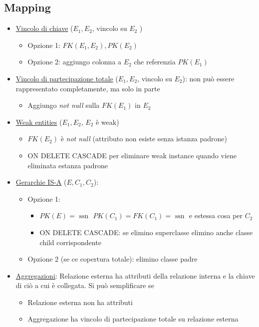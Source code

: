 \subsection{Mapping}
\begin{itemize}
	\item \underline{Vincolo di chiave} ($ E_1, E_2 $, vincolo su $ E_2 $ )
	      \begin{itemize}
		      \item Opzione 1: $ FK\left(E_1, E_2\right), PK\left(E_2\right) $
		      \item Opzione 2: aggiungo colonna a $ E_2 $ che referenzia $ PK\left(E_1\right) $
	      \end{itemize}
	\item \underline{Vincolo di partecipazione totale} ($ E_1, E_2 $, vincolo su $ E_2 $): non può essere rappresentato completamente, ma solo in parte
	      \begin{itemize}
		      \item Aggiungo \textit{not null} sulla $ FK\left(E_1\right) $ in $ E_2 $
	      \end{itemize}
	\item \underline{Weak entities} ($ E_1, E_2 $, $ E_2 $ è weak)
	      \begin{itemize}
		      \item $ FK\left(E_2\right) $ è \textit{not null} (attributo non esiste senza istanza padrone)
		      \item ON DELETE CASCADE per eliminare weak instance quando viene eliminata estanza padrone
	      \end{itemize}
	\item \underline{Gerarchie IS-A} ($ E, C_1, C_2 $):
	      \begin{itemize}
		      \item Opzione 1:
		            \begin{itemize}
			            \item $ PK(E) = \text{ ssn }$  $ PK\left(C_1\right) = FK\left(C_1\right) = \text{ ssn } $ e estessa cosa per $ C_2 $
			            \item ON DELETE CASCADE: se elimino superclasse elimino anche classe child corrispondente
		            \end{itemize}
		      \item Opzione 2 (se ce copertura totale): elimino classe padre
	      \end{itemize}
	\item \underline{Aggregazioni}: Relazione esterna ha attributi della relazione interna e la chiave di ciò a cui è collegata. Si può semplificare se
	      \begin{itemize}
		      \item Relazione esterna non ha attributi
		      \item Aggregazione ha vincolo di partecipazione totale su relazione esterna
	      \end{itemize}
\end{itemize}
